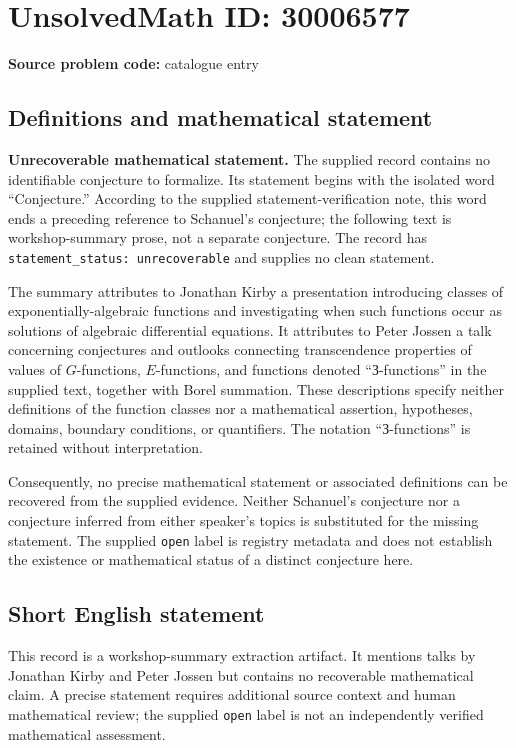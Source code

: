 \documentclass[11pt]{article}
\begin{document}
\section*{UnsolvedMath ID: 30006577}
\textbf{Source problem code:} catalogue entry
\subsection{Definitions and mathematical statement}
\textbf{Unrecoverable mathematical statement.} The supplied record contains no identifiable conjecture to formalize. Its statement begins with the isolated word ``Conjecture.'' According to the supplied statement-verification note, this word ends a preceding reference to Schanuel's conjecture; the following text is workshop-summary prose, not a separate conjecture. The record has \texttt{statement\_status: unrecoverable} and supplies no clean statement.

The summary attributes to Jonathan Kirby a presentation introducing classes of exponentially-algebraic functions and investigating when such functions occur as solutions of algebraic differential equations. It attributes to Peter Jossen a talk concerning conjectures and outlooks connecting transcendence properties of values of \(G\)-functions, \(E\)-functions, and functions denoted ``З-functions'' in the supplied text, together with Borel summation. These descriptions specify neither definitions of the function classes nor a mathematical assertion, hypotheses, domains, boundary conditions, or quantifiers. The notation ``З-functions'' is retained without interpretation.

Consequently, no precise mathematical statement or associated definitions can be recovered from the supplied evidence. Neither Schanuel's conjecture nor a conjecture inferred from either speaker's topics is substituted for the missing statement. The supplied \texttt{open} label is registry metadata and does not establish the existence or mathematical status of a distinct conjecture here.
\subsection{Short English statement}
This record is a workshop-summary extraction artifact. It mentions talks by Jonathan Kirby and Peter Jossen but contains no recoverable mathematical claim. A precise statement requires additional source context and human mathematical review; the supplied \texttt{open} label is not an independently verified mathematical assessment.
\end{document}

